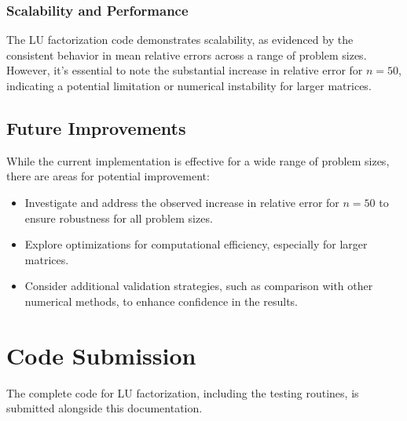 \documentclass{article}
\begin{document}
\subsubsection{Scalability and Performance}
The LU factorization code demonstrates scalability, as evidenced by the consistent behavior in mean relative errors across a range of problem sizes. However, it's essential to note the substantial increase in relative error for $n=50$, indicating a potential limitation or numerical instability for larger matrices.

\subsection{Future Improvements}
While the current implementation is effective for a wide range of problem sizes, there are areas for potential improvement:

\begin{itemize}
    \item Investigate and address the observed increase in relative error for $n=50$ to ensure robustness for all problem sizes.
    \item Explore optimizations for computational efficiency, especially for larger matrices.
    \item Consider additional validation strategies, such as comparison with other numerical methods, to enhance confidence in the results.
\end{itemize}

\section{Code Submission}
The complete code for LU factorization, including the testing routines, is submitted alongside this documentation.
\end{document}
